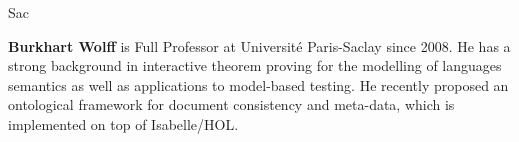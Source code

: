 \begin{sitedescription}{Sac}
\begin{compactitem}
\item {\bf Burkhart Wolff} is Full Professor at Université
  Paris-Saclay since 2008. He has a strong background in interactive
  theorem proving for the modelling of languages semantics as well as
  applications to model-based testing. He recently proposed an
  ontological framework for document consistency and meta-data, which is
  implemented on top of Isabelle/HOL.

\end{compactitem}

\end{sitedescription}


